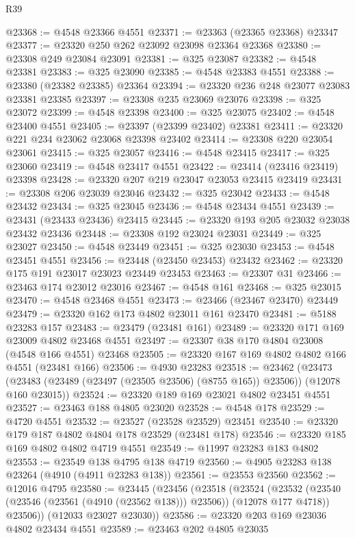 \begin{lexlean}{R39}
\begin{coremodule}
@23368 := @4548 @23366 @4551
@23371 := @23363 (@23365 @23368) @23347
@23377 := @23320 @250 @262 @23092 @23098 @23364 @23368
@23380 := @23308 @249 @23084 @23091
@23381 := @325 @23087
@23382 := @4548 @23381
@23383 := @325 @23090
@23385 := @4548 @23383 @4551
@23388 := @23380 (@23382 @23385) @23364
@23394 := @23320 @236 @248 @23077 @23083 @23381 @23385
@23397 := @23308 @235 @23069 @23076
@23398 := @325 @23072
@23399 := @4548 @23398
@23400 := @325 @23075
@23402 := @4548 @23400 @4551
@23405 := @23397 (@23399 @23402) @23381
@23411 := @23320 @221 @234 @23062 @23068 @23398 @23402
@23414 := @23308 @220 @23054 @23061
@23415 := @325 @23057
@23416 := @4548 @23415
@23417 := @325 @23060
@23419 := @4548 @23417 @4551
@23422 := @23414 (@23416 @23419) @23398
@23428 := @23320 @207 @219 @23047 @23053 @23415 @23419
@23431 := @23308 @206 @23039 @23046
@23432 := @325 @23042
@23433 := @4548 @23432
@23434 := @325 @23045
@23436 := @4548 @23434 @4551
@23439 := @23431 (@23433 @23436) @23415
@23445 := @23320 @193 @205 @23032 @23038 @23432 @23436
@23448 := @23308 @192 @23024 @23031
@23449 := @325 @23027
@23450 := @4548 @23449
@23451 := @325 @23030
@23453 := @4548 @23451 @4551
@23456 := @23448 (@23450 @23453) @23432
@23462 := @23320 @175 @191 @23017 @23023 @23449 @23453
@23463 := @23307 @31
@23466 := @23463 @174 @23012 @23016
@23467 := @4548 @161
@23468 := @325 @23015
@23470 := @4548 @23468 @4551
@23473 := @23466 (@23467 @23470) @23449
@23479 := @23320 @162 @173 @4802 @23011 @161 @23470
@23481 := @5188 @23283 @157
@23483 := @23479 (@23481 @161)
@23489 := @23320 @171 @169 @23009 @4802 @23468 @4551
@23497 := @23307 @38 @170 @4804 @23008 (@4548 @166 @4551) @23468
@23505 := @23320 @167 @169 @4802 @4802 @166 @4551 (@23481 @166)
@23506 := @4930 @23283
@23518 := @23462
    (@23473 (@23483 (@23489 (@23497 (@23505 @23506) (@8755 @165)) @23506)) (@12078 @160 @23015))
@23524 := @23320 @189 @169 @23021 @4802 @23451 @4551
@23527 := @23463 @188 @4805 @23020
@23528 := @4548 @178
@23529 := @4720 @4551
@23532 := @23527 (@23528 @23529) @23451
@23540 := @23320 @179 @187 @4802 @4804 @178 @23529 (@23481 @178)
@23546 := @23320 @185 @169 @4802 @4802 @4719 @4551
@23549 := @11997 @23283 @183 @4802
@23553 := @23549 @138 @4795 @138 @4719
@23560 := @4905 @23283 @138 @23264 (@4910 (@4911 @23283 @138))
@23561 := @23553 @23560
@23562 := @12016 @4795
@23580 := @23445
    (@23456
      (@23518
        (@23524
          (@23532 (@23540 (@23546 (@23561 (@4910 (@23562 @138))) @23506)) (@12078 @177 @4718))
          @23506))
      (@12033 @23027 @23030))
@23586 := @23320 @203 @169 @23036 @4802 @23434 @4551
@23589 := @23463 @202 @4805 @23035

\end{coremodule}
\end{lexlean}

